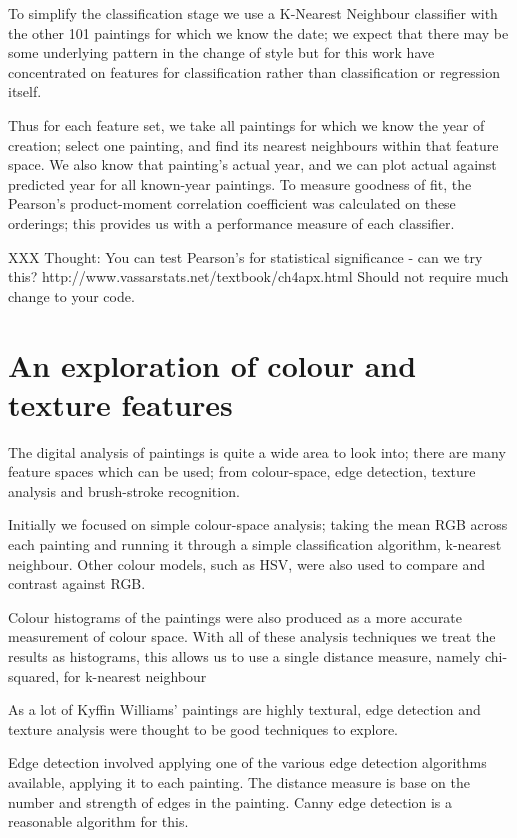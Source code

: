 \documentclass[conference,a4paper]{IEEEtran}
\begin{document}
To simplify the classification stage we use a K-Nearest Neighbour classifier
with the other 101 paintings for which we know the date; we expect that there
may be some underlying pattern in the change of style but for this work have
concentrated on features for classification rather than classification or
regression itself.
 
Thus for each feature set, we take all paintings for which we know the year of
creation; select one painting, and find its nearest neighbours within that
feature space. We also know that painting's actual year, and we can plot actual
against predicted year for all known-year paintings.  To measure goodness of
fit, the Pearson's product-moment correlation coefficient was calculated on
these orderings; this provides us with a performance measure of each
classifier.

 XXX Thought: You can test Pearson's for statistical significance - can we try this?
 http://www.vassarstats.net/textbook/ch4apx.html 
 Should not require much change to your code.


\section{An exploration of colour and texture features}


The digital analysis of paintings is quite a wide area to look into; there are
many feature spaces which can be used; from colour-space, edge detection,
texture analysis and brush-stroke recognition.

Initially we focused on simple colour-space analysis; taking the mean RGB
across each painting and running it through a simple classification algorithm,
k-nearest neighbour. Other colour models, such as HSV, were also used to
compare and contrast against RGB. 

Colour histograms of the paintings were also produced as a more accurate
measurement of colour space. With all of these analysis techniques we treat the results as 
histograms, this allows us to use a single distance measure, namely chi-squared, for k-nearest
neighbour

As a lot of Kyffin Williams' paintings are highly textural, edge detection and
texture analysis were thought to be good techniques to explore.

Edge detection involved applying one of the various edge detection algorithms
available, applying it to each painting. The distance measure is base on the
number and strength of edges in the painting. Canny\cite{Canny1986Computational} 
edge detection is a reasonable algorithm for this. %
\end{document}
